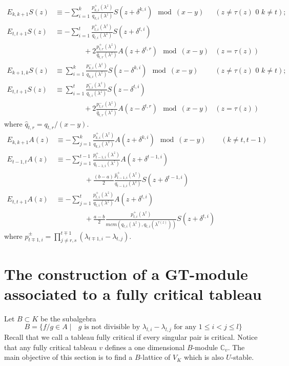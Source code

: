 \documentclass[11pt,fleqn]{article}
\newcommand\CC{\mathbb C}
\begin{document}
\begin{align*}
E_{k,k+1} S(z)
	&\equiv -\sum_{i=1}^k \frac{p_{k,i}^+(\lambda^z)}{q_{k,i}(\lambda^z)} 
	S(z+\delta^{k,i}) \mod (x-y) &(z \neq \tau(z) \mbox{ 0 } k \neq t); \\
E_{t,t+1} S(z)
	&\equiv -\sum_{i=1}^t \frac{p_{t,i}^+(\lambda^z)}{q_{t,i}(\lambda^z)} 
	S(z+\delta^{t,i}) \\&\qquad \qquad + 2\frac{p^+_{t,r}(\lambda^z)}{\hat q_{t,r}(\lambda^z)} A(z+\delta^{t,r}) \mod (x-y) &(z = \tau(z)) \\
E_{k+1,k} S(z)
	&\equiv \sum_{i=1}^k \frac{p_{k,i}^-(\lambda^z)}{q_{k,i}(\lambda^z)} 
	S(z-\delta^{k,i}) \mod (x-y) &(z \neq \tau(z) \mbox{ 0 } k \neq t); \\
E_{t,t+1} S(z)
	&\equiv \sum_{i=1}^t \frac{p_{t,i}^-(\lambda^z)}{q_{t,i}(\lambda^z)} 
	S(z-\delta^{t,i}) \\&\qquad \qquad + 2\frac{p^-_{t,r}(\lambda^z)}{\hat q_{t,r}(\lambda^z)} A(z-\delta^{t,r}) \mod (x-y) &(z = \tau(z))
\end{align*}
where $\hat q_{t,r} = q_{t,r}/(x-y)$.
\begin{align*}
E_{k,k+1} A(z)
	&\equiv -\sum_{j=1}^k \frac{p_{k,i}^+(\lambda^z)}{q_{k,i}(\lambda^z)}
	A(z+\delta^{k,i}) \mod (x-y)&(k \neq t,t-1) \\
E_{t-1,t} A(z) 
	&\equiv -\sum_{j=1}^{t-1} \frac{p_{t-1,i}^+(\lambda^z)}
	{q_{t-1,i}(\lambda^z)} A(z+\delta^{t-1,i}) \\
	&\qquad \qquad + \frac{(b-a)}{2}\frac{\hat p^+_{t-1,i}(\lambda^z)}
	{q_{t-1,i}(\lambda^z)} S(z + \delta^{t-1,i})\\
E_{t,t+1} A(z)
	&\equiv -\sum_{j=1}^{t} \frac{p_{t,i}^+(\lambda^z)}
	{q_{t,i}(\lambda^z)} A(z+\delta^{t,i}) \\
	&\qquad \qquad + \frac{a-b}{2} \frac{p_{t,i}^+(\lambda^z)}
	{mcm(q_{t,i}(\lambda^z),q_{t,i}(\lambda^{\tau(z)}))} S(z + \delta^{t,i})
\end{align*}
where $\displaystyle \hat p_{t \mp 1,i}^\pm = \prod_{j \neq r,s}^{t\mp 1} 
(\lambda_{t\mp 1, i} - \lambda_{t,j})$.

\newpage

\section{The construction of a GT-module associated to a fully critical 
tableau}

Let $B \subset K$ be the subalgebra
\[
B 
	= \{f/g \in A \mid \mbox{ $g$ is not divisible by }
		\lambda_{l,i} - \lambda_{l,j} \mbox{ for any } 1 \leq i < j \leq l\}
\]
Recall that we call a tableau fully critical if every singular pair is 
critical. Notice that any fully critical tableau $v$ defines a one dimensional 
$B$-module $\CC_v$. The main objective of this section is to find a 
$B$-lattice of $V_K$ which is also $U$-stable.
\end{document}
